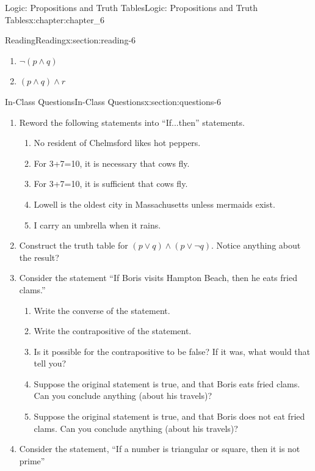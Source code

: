 \documentclass[oneside,10pt,]{book}
\numberwithin{equation}{section}
\begin{document}
\begin{chapterptx}{Logic: Propositions and Truth Tables}{}{Logic: Propositions and Truth Tables}{}{}{x:chapter:chapter_6}
\begin{sectionptx}{Reading}{}{Reading}{}{}{x:section:reading-6}
\begin{itemize}[label=\textbullet]
\begin{multicols}{2}
\begin{enumerate}[label=(\alph*)]
\item{}\(\neg (p\land  q )\)%
\item{}\((p \land q)\land r\)%
\end{enumerate}
\end{multicols}
%
\end{itemize}
%
\end{sectionptx}
%
%
\typeout{************************************************}
\typeout{************************************************}
%
\begin{sectionptx}{In-Class Questions}{}{In-Class Questions}{}{}{x:section:questions-6}
%
\begin{enumerate}[label=\arabic*.]
\item{}Reword the following statements into ``If...then'' statements.%
\begin{enumerate}[label=(\alph*)]
\item{}No resident of Chelmsford likes hot peppers.%
\item{}For 3+7=10, it is necessary that cows fly.%
\item{}For 3+7=10, it is sufficient that cows fly.%
\item{}Lowell is the oldest city in Massachusetts unless mermaids exist.%
\item{}I carry an umbrella when it rains.%
\end{enumerate}
%
\item{}Construct the truth table for \((p \lor q) \land (p\lor \neg q)\).   Notice anything about the result?%
\item{}Consider the statement “If Boris visits Hampton Beach, then he eats fried clams.”%
\begin{enumerate}[label=(\alph*)]
\item{}Write the converse of the statement.%
\item{}Write the contrapositive of the statement.%
\item{}Is it possible for the contrapositive to be false? If it was, what would that tell you?%
\item{}Suppose the original statement is true, and that Boris eats fried clams. Can you conclude anything (about his travels)?%
\item{}Suppose the original statement is true, and that Boris does not eat fried clams. Can you conclude anything (about his travels)?%
\end{enumerate}
%
\item{}Consider the statement, ``If a number is triangular or square, then it is not prime''%

\end{enumerate}
\end{sectionptx}
\end{chapterptx}
\end{document}
